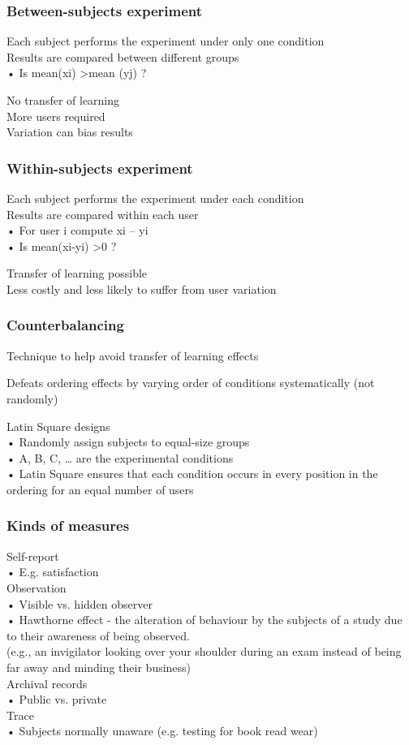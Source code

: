 \documentclass[]{project_plan}
\begin{document}
\subsubsection{Between-subjects experiment}

Each subject performs the experiment under only one condition\\
Results are compared between different groups\\
• Is mean(xi) \textgreater mean (yj) ?

No transfer of learning\\
More users required\\
Variation can bias results

\subsubsection{Within-subjects experiment}
Each subject performs the experiment under each condition\\
Results are compared within each user\\
• For user i compute xi – yi\\
• Is mean(xi-yi) \textgreater 0 ?

Transfer of learning possible\\
Less costly and less likely to suffer from user variation

\subsubsection{Counterbalancing}
Technique to help avoid transfer of learning effects

Defeats ordering effects by varying order of conditions systematically (not randomly)

Latin Square designs\\
• Randomly assign subjects to equal-size groups\\
• A, B, C, … are the experimental conditions\\
• Latin Square ensures that each condition occurs in every
position in the ordering for an equal number of users

\subsubsection{Kinds of measures}

Self-report\\
• E.g. satisfaction\\
Observation\\
• Visible vs. hidden observer\\
• Hawthorne effect - the alteration of behaviour by the subjects of a study due to their awareness of being observed.\\
(e.g., an invigilator looking over your shoulder during an exam instead of being far away and minding their business)\\
Archival records\\
• Public vs. private\\
Trace\\
• Subjects normally unaware (e.g. testing for book read wear)
\end{document}
